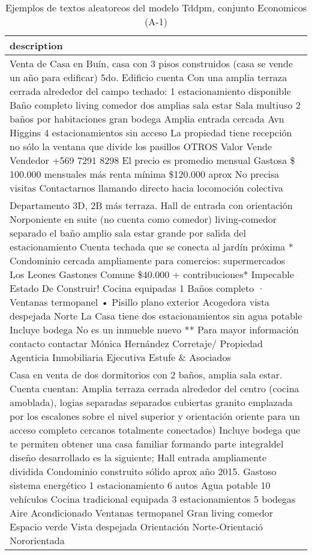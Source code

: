 \begin{table}[H]
\centering
\fontsize{8}{14}\selectfont
\caption{Ejemplos de textos aleatoreos del modelo Tddpm, conjunto Economicos (A-1)}
\label{table-sample10-economicos-a-1-tddpm_mlp-text}
\begin{tabular}{|m{50em}|}
\hline
\rowcolor[gray]{0.8}
description \\
\hline Venta de Casa en Buín, casa con 3 pisos construidos (casa se vende un año para edificar) 5do. Edificio cuenta Con una amplia terraza cerrada alrededor del campo techado: 1 estacionamiento disponible Baño completo living comedor dos amplias sala estar Sala multiuso 2 baños por habitaciones gran bodega Amplia entrada cercada Avn Higgins 4 estacionamientos sin acceso La propiedad tiene recepción no sólo la ventana que divide los pasillos OTROS Valor Vende Vendedor +569 7291 8298 El precio es promedio mensual Gastosa \$ 100.000 mensuales más renta mínima \$120.000 aprox No precisa visitas Contactarnos llamando directo hacia locomoción colectiva \\
\hline Departamento 3D, 2B más terraza. Hall de entrada con orientación Norponiente en suite (no cuenta como comedor) living-comedor separado el baño amplio sala estar grande por salida del estacionamiento Cuenta techada que se conecta al jardín próxima * Condominio cercada ampliamente para comercios: supermercados Los Leones Gastones Comune \$40.000 + contribuciones* Impecable Estado De Construir! Cocina equipadas 1 Baños completo · Ventanas termopanel • Pisillo plano exterior Acogedora vista despejada Norte La Casa tiene dos estacionamientos sin agua potable Incluye bodega No es un inmueble nuevo ** Para mayor información contacto contactar Mónica Hernández Corretaje/ Propiedad Agenticia Inmobiliaria Ejecutiva Estufe \& Asociados \\
\hline Casa en venta de dos dormitorios con 2 baños, amplia sala estar. Cuenta cuentan: Amplia terraza cerrada alrededor del centro (cocina amoblada), logias separadas separados cubiertas granito emplazada por los escalones sobre el nivel superior y orientación oriente para un acceso completo cercanos totalmente conectados) Incluye bodega que te permiten obtener una casa familiar formando parte integraldel diseño desarrollado es la siguiente; Hall entrada ampliamente dividida Condominio construito sólido aprox año 2015. Gastoso sistema energético 1 estacionamiento 6 autos Agua potable 10 vehículos Cocina tradicional equipada 3 estacionamientos 5 bodegas Aire Acondicionado Ventanas termopanel Gran living comedor Espacio verde Vista despejada Orientación Norte-Orientació Nororientada \\

\end{tabular}
\end{table}

